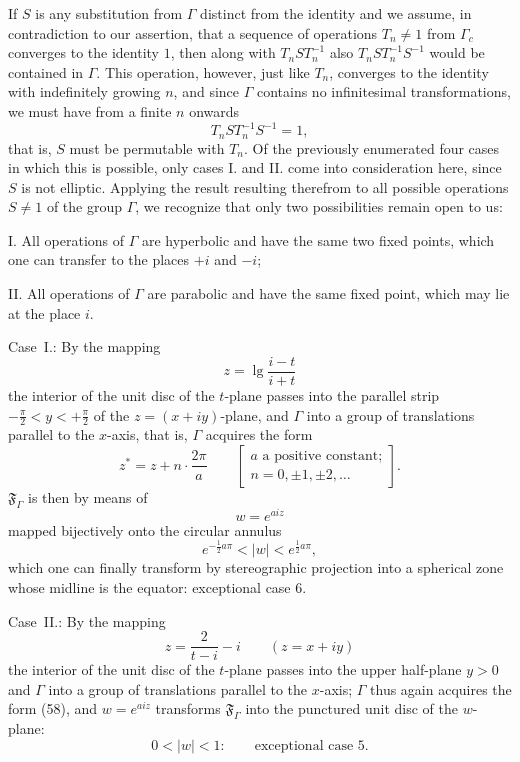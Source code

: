 \documentclass{article}
\begin{document}
If $S$ is any substitution from $\varGamma$ distinct from the identity and we assume, in contradiction to our assertion, that a sequence of operations $T_n \neq 1$ from $\varGamma_c$ converges to the identity $1$, then along with $T_n S T_n^{-1}$ also $T_n S T_n^{-1} S^{-1}$ would be contained in $\varGamma$. This operation, however, just like $T_n$, converges to the identity with indefinitely growing $n$, and since $\varGamma$ contains no infinitesimal transformations, we must have from a finite $n$ onwards
\[ T_n S T_n^{-1} S^{-1} = 1, \]
that is, $S$ must be permutable with $T_n$. Of the previously enumerated four cases in which this is possible, only cases I. and II. come into consideration here, since $S$ is not elliptic. Applying the result resulting therefrom to all possible operations $S \neq 1$ of the group $\varGamma$, we recognize that only two possibilities remain open to us:

I. All operations of $\varGamma$ are hyperbolic and have the same two fixed points, which one can transfer to the places $+i$ and $-i$;

II. All operations of $\varGamma$ are parabolic and have the same fixed point, which may lie at the place $i$.

Case~I.: By the mapping
\[ z = \lg \frac{i - t}{i + t} \]
the interior of the unit disc of the $t$-plane passes into the parallel strip $-\frac{\pi}{2} < y < +\frac{\pi}{2}$ of the $z = (x + iy)$-plane, and $\varGamma$ into a group of translations parallel to the $x$-axis, that is, $\varGamma$ acquires the form
\[ z^* = z + n \cdot \frac{2\pi}{a} \qquad \begin{bmatrix} a \text{ a positive constant;} \\ n = 0, \pm 1, \pm 2, \dots \end{bmatrix}. \tag{58} \]
$\mathfrak{F}_\varGamma$ is then by means of
\[ w = e^{aiz} \]
mapped bijectively onto the circular annulus
\[ e^{-\frac{1}{2}a\pi} < |w| < e^{\frac{1}{2}a\pi}, \]
which one can finally transform by stereographic projection into a spherical zone whose midline is the equator: exceptional case 6.

Case~II.: By the mapping
\[ z = \frac{2}{t - i} - i \qquad (z = x + iy) \]
the interior of the unit disc of the $t$-plane passes into the upper half-plane $y > 0$ and $\varGamma$ into a group of translations parallel to the $x$-axis; $\varGamma$ thus again acquires the form (58), and $w = e^{aiz}$ transforms $\mathfrak{F}_\varGamma$ into the punctured unit disc of the $w$-plane:
\[ 0 < |w| < 1\colon \qquad \text{exceptional case 5.} \]
\end{document}
